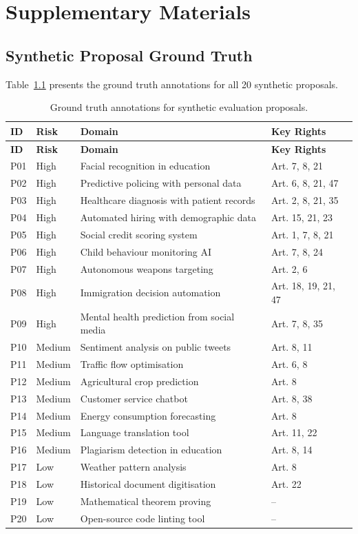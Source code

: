 \chapter{Supplementary Materials}
\label{app:supplementary}

\section{Synthetic Proposal Ground Truth}
\label{app:groundtruth}

Table~\ref{tab:groundtruth} presents the ground truth annotations for all 20 synthetic proposals.

\begin{longtable}{llp{5cm}l}
\caption{Ground truth annotations for synthetic evaluation proposals.}
\label{tab:groundtruth} \\
\toprule
\textbf{ID} & \textbf{Risk} & \textbf{Domain} & \textbf{Key Rights} \\
\midrule
\endfirsthead
\toprule
\textbf{ID} & \textbf{Risk} & \textbf{Domain} & \textbf{Key Rights} \\
\midrule
\endhead
P01 & High & Facial recognition in education & Art. 7, 8, 21 \\
P02 & High & Predictive policing with personal data & Art. 6, 8, 21, 47 \\
P03 & High & Healthcare diagnosis with patient records & Art. 2, 8, 21, 35 \\
P04 & High & Automated hiring with demographic data & Art. 15, 21, 23 \\
P05 & High & Social credit scoring system & Art. 1, 7, 8, 21 \\
P06 & High & Child behaviour monitoring AI & Art. 7, 8, 24 \\
P07 & High & Autonomous weapons targeting & Art. 2, 6 \\
P08 & High & Immigration decision automation & Art. 18, 19, 21, 47 \\
P09 & High & Mental health prediction from social media & Art. 7, 8, 35 \\
P10 & Medium & Sentiment analysis on public tweets & Art. 8, 11 \\
P11 & Medium & Traffic flow optimisation & Art. 6, 8 \\
P12 & Medium & Agricultural crop prediction & Art. 8 \\
P13 & Medium & Customer service chatbot & Art. 8, 38 \\
P14 & Medium & Energy consumption forecasting & Art. 8 \\
P15 & Medium & Language translation tool & Art. 11, 22 \\
P16 & Medium & Plagiarism detection in education & Art. 8, 14 \\
P17 & Low & Weather pattern analysis & Art. 8 \\
P18 & Low & Historical document digitisation & Art. 22 \\
P19 & Low & Mathematical theorem proving & -- \\
P20 & Low & Open-source code linting tool & -- \\
\bottomrule
\end{longtable}


